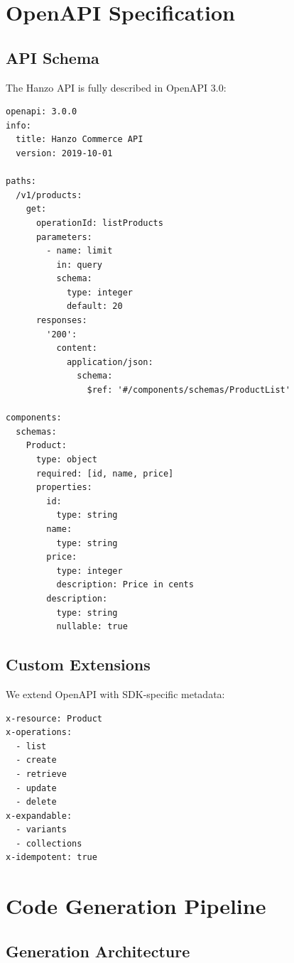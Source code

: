 \documentclass[11pt,a4paper]{article}
\begin{document}
\section{OpenAPI Specification}

\subsection{API Schema}

The Hanzo API is fully described in OpenAPI 3.0:

\begin{lstlisting}[caption=OpenAPI Schema Excerpt]
openapi: 3.0.0
info:
  title: Hanzo Commerce API
  version: 2019-10-01

paths:
  /v1/products:
    get:
      operationId: listProducts
      parameters:
        - name: limit
          in: query
          schema:
            type: integer
            default: 20
      responses:
        '200':
          content:
            application/json:
              schema:
                $ref: '#/components/schemas/ProductList'

components:
  schemas:
    Product:
      type: object
      required: [id, name, price]
      properties:
        id:
          type: string
        name:
          type: string
        price:
          type: integer
          description: Price in cents
        description:
          type: string
          nullable: true
\end{lstlisting}

\subsection{Custom Extensions}

We extend OpenAPI with SDK-specific metadata:

\begin{lstlisting}[caption=SDK Extensions]
x-resource: Product
x-operations:
  - list
  - create
  - retrieve
  - update
  - delete
x-expandable:
  - variants
  - collections
x-idempotent: true
\end{lstlisting}

\section{Code Generation Pipeline}

\subsection{Generation Architecture}
\end{document}
